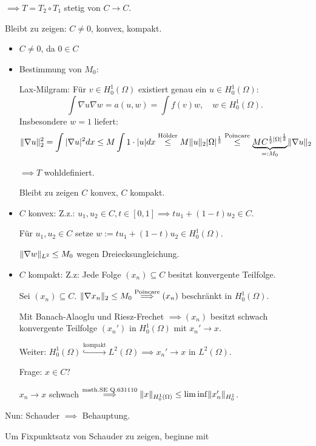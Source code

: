 $\implies T = T_2 \circ T_1$ stetig von $C \to C$.

Bleibt zu zeigen: $C \neq 0$, konvex, kompakt.

\begin{itemize}
  \item $C \neq 0$, da $0 \in C$
  \item Bestimmung von $M_0$:

    Lax-Milgram: Für $v \in H_0^1(\Omega)$ existiert genau ein $u \in H_0^1(\Omega)$:
    $$
    \int \nabla u \nabla w = a(u,w) = \int f(v) w, \quad w \in H_0^1(\Omega).
    $$
    Insbesondere $w = 1$ liefert:
    $$
    \lVert \nabla u \rVert_2^2 = \int|\nabla u|^2 dx \leq M \int 1 \cdot |u| dx \overset{\text{Hölder}}{\leq} M \lVert u \rVert_2 |\Omega|^{\frac{1}{2}} \overset{\text{Poincare}}{\leq} \underbrace{M C^{\frac{1}{2} |\Omega|^{\frac{1}{2}}}}_{=: M_0} \lVert \nabla u \rVert_2
    $$

    $\implies T$ wohldefiniert.

    Bleibt zu zeigen $C$ konvex, $C$ kompakt.
  \item $C$ konvex:
    Z.z.: $u_1, u_2 \in C, t \in [0,1] \implies tu_1 + (1 - t)u_2 \in C$.

    Für $u_1, u_2 \in C$ setze $w := t u_1 + (1 - t)u_2 \in H_0^1(\Omega)$.

    $\lVert \nabla w \rVert_{L^2} \leq M_0$ wegen Dreiecksungleichung.

  \item $C$ kompakt: Z.z: Jede Folge $(x_n) \subseteq C$ besitzt konvergente Teilfolge.

    Sei $(x_n) \subseteq C$. $\lVert \nabla x_n \rVert_2 \leq M_0 \overset{\text{Poincare}}{\implies} (x_n)$ beschränkt in $H_0^1(\Omega)$.

    Mit Banach-Alaoglu und Riesz-Frechet $\implies (x_n)$ besitzt schwach konvergente Teilfolge $(x_n')$ in $H_0^1(\Omega)$ mit $x_n' \to x$.

    Weiter: $H_0^1(\Omega) \overset{\text{kompakt}}{\hookrightarrow} L^2(\Omega) \implies x_n' \to x $ in $L^2(\Omega)$.

    Frage: $x \in C$?

    $x_n \to x$ schwach $\overset{\text{math.SE Q.631110}}{\implies} \lVert x \rVert_{H_0^1(\Omega)} \leq \lim \inf \lVert x_n' \rVert_{H_0^1}$.
\end{itemize}

Nun: Schauder $\implies$ Behauptung.

Um Fixpunktsatz von Schauder zu zeigen, beginne mit

